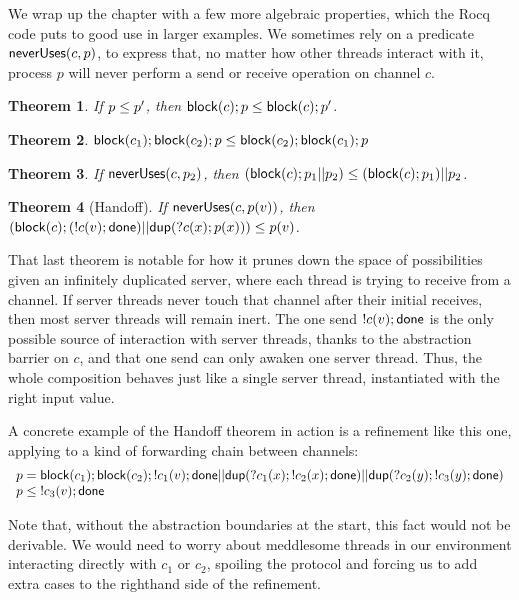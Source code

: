 \documentclass{amsbook}
\newtheorem{theorem}{Theorem}[chapter]
\theoremstyle{definition}
\theoremstyle{remark}
\numberwithin{section}{chapter}
\numberwithin{equation}{chapter}
\begin{document}
\newcommand{\neverUses}[2]{\mt{neverUses}(#1, #2)}

We wrap up the chapter with a few more algebraic properties, which the Rocq code puts to good use in larger examples.
We sometimes rely on a predicate $\neverUses{c}{p}$, to express that, no matter how other threads interact with it, process $p$ will never perform a send or receive operation on channel $c$.

\begin{theorem}
  If $p \leq p'$, then $\mathsf{block}(c); p \leq \mathsf{block}(c); p'$.
\end{theorem}

\begin{theorem}
  $\mathsf{block}(c_1); \mathsf{block}(c_2); p \leq \mathsf{block}(c_2); \mathsf{block}(c_1); p$
\end{theorem}

\begin{theorem}
  If $\neverUses{c}{p_2}$, then $(\mathsf{block}(c); p_1 || p_2) \leq (\mathsf{block}(c); p_1) || p_2$.
\end{theorem}

\begin{theorem}[Handoff]
  If $\neverUses{c}{p(v)}$, then $(\mathsf{block}(c); (!c(v); \mathsf{done}) || \mathsf{dup}(?c(x); p(x))) \leq p(v)$.
\end{theorem}

That last theorem is notable for how it prunes down the space of possibilities given an infinitely duplicated server, where each thread is trying to receive from a channel.
If server threads never touch that channel after their initial receives, then most server threads will remain inert.
The one send $!c(v); \mathsf{done}$ is the only possible source of interaction with server threads, thanks to the abstraction barrier on $c$, and that one send can only awaken one server thread.
Thus, the whole composition behaves just like a single server thread, instantiated with the right input value.

A concrete example of the Handoff theorem in action is a refinement like this one, applying to a kind of forwarding chain between channels:
$$\begin{array}{l}
  p = \mathsf{block}(c_1); \mathsf{block}(c_2); !c_1(v); \mathsf{done} || \mathsf{dup}(?c_1(x); !c_2(x); \mathsf{done}) || \mathsf{dup}(?c_2(y); !c_3(y); \mathsf{done}) \\
  p \leq \; !c_3(v); \mathsf{done}
\end{array}$$

Note that, without the abstraction boundaries at the start, this fact would not be derivable.
We would need to worry about meddlesome threads in our environment interacting directly with $c_1$ or $c_2$, spoiling the protocol and forcing us to add extra cases to the righthand side of the refinement.
\end{document}
